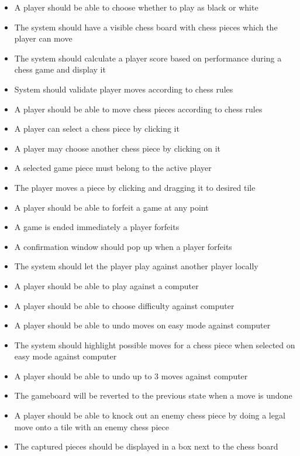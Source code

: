 \documentclass[letterpaper,11pt]{article}
\begin{document}
\begin{itemize}
	\item A player should be able to choose whether to play as black or white
	\item The system should have a visible chess board with chess pieces which the player can move
	\item The system should calculate a player score based on performance during a chess game and display it
	\item System should validate player moves according to chess rules
	\item A player should be able to move chess pieces according to chess rules
	\item A player can select a chess piece by clicking it
	\item A player may choose another chess piece by clicking on it
	\item A selected game piece must belong to the active player
	\item The player moves a piece by clicking and dragging it to desired tile
	\item A player should be able to forfeit a game at any point
	\item A game is ended immediately a player forfeits
	\item A confirmation window should pop up when a player forfeits
	\item The system should let the player play against another player locally
	\item A player should be able to play against a computer
	\item A player should be able to choose difficulty against computer
	\item A player should be able to undo moves on easy mode against computer
	\item The system should highlight possible moves for a chess piece when selected on easy mode against computer
	\item A player should be able to undo up to 3 moves against computer
	\item The gameboard will be reverted to the previous state when a move is undone
	\item A player should be able to knock out an enemy chess piece by doing a legal move onto a tile with an enemy chess piece
	\item The captured pieces should be displayed in a box next to the chess board
\end{itemize}
\end{document}
